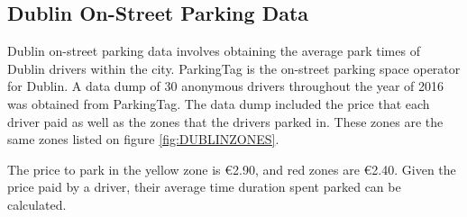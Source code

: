 \subsection{Dublin On-Street Parking Data}\label{ssec:on-street_parking_data}
Dublin on-street parking data involves obtaining the average park times of Dublin drivers within the city. ParkingTag is the on-street parking space operator for Dublin. A data dump of 30 anonymous drivers throughout the year of 2016 was obtained from ParkingTag. The data dump included the price that each driver paid as well as the zones that the drivers parked in. These zones are the same zones listed on figure \ref{fig:DUBLINZONES}.

The price to park in the yellow zone is €2.90, and red zones are €2.40. Given the price paid by a driver, their average time duration spent parked can be calculated.